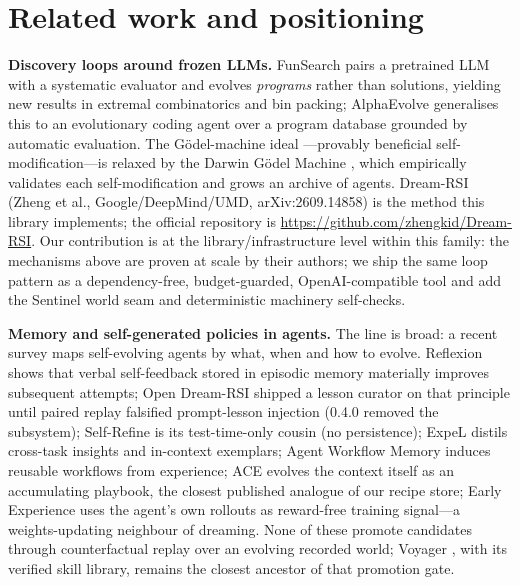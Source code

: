 \documentclass[11pt,a4paper]{article}
\newcommand{\hdr}[1]{\textbf{#1}}
\begin{document}
\section{Related work and positioning}
\label{sec:related}

\hdr{Discovery loops around frozen LLMs.} FunSearch \cite{funsearch} pairs a
pretrained LLM with a systematic evaluator and evolves \emph{programs} rather
than solutions, yielding new results in extremal combinatorics and bin
packing; AlphaEvolve \cite{alphaevolve} generalises this to an evolutionary
coding agent over a program database grounded by automatic evaluation. The
G\"odel-machine ideal \cite{godel}---provably beneficial self-modification---is
relaxed by the Darwin G\"odel Machine \cite{dgm}, which empirically validates
each self-modification and grows an archive of agents. Dream-RSI
\cite{dreamrsi} (Zheng et al., Google/DeepMind/UMD, arXiv:2609.14858) is the
method this library implements; the official repository is
\url{https://github.com/zhengkid/Dream-RSI}. Our contribution is at the
library/infrastructure level within this family: the mechanisms above are
proven at scale by their authors; we ship the same loop pattern as a
dependency-free, budget-guarded, OpenAI-compatible tool and add the Sentinel world seam and deterministic machinery
self-checks.

\hdr{Memory and self-generated policies in agents.} The line is broad: a
recent survey \cite{selfevosurvey} maps self-evolving agents by what, when
and how to evolve. Reflexion \cite{reflexion} shows that verbal self-feedback
stored in episodic memory materially improves subsequent attempts; Open
Dream-RSI shipped a lesson curator on that principle until paired replay
falsified prompt-lesson injection (0.4.0 removed the subsystem); Self-Refine \cite{selfrefine} is its test-time-only cousin (no persistence);
ExpeL \cite{expel} distils cross-task insights and in-context exemplars;
Agent Workflow Memory \cite{awm} induces reusable workflows from experience;
ACE \cite{ace} evolves the context itself as an accumulating playbook, the
closest published analogue of our recipe store; Early Experience
\cite{earlyexp} uses the agent's own rollouts as reward-free training
signal---a weights-updating neighbour of dreaming. None of these promote
candidates through counterfactual replay over an evolving recorded world;
Voyager \cite{voyager}, with its verified skill library, remains the closest
ancestor of that promotion gate.
\end{document}
